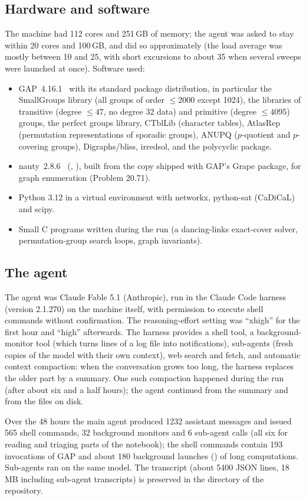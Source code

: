 \subsection{Hardware and software}
The machine had 112 cores and 251\,GB of memory; the agent was asked to stay within 20 cores and 100\,GB, and did
so approximately (the load average was mostly between 10 and 25, with short excursions to about 35 when several
sweeps were launched at once). Software used:
\begin{itemize}
\item GAP~4.16.1~\cite{GAP} with its standard package distribution, in particular the SmallGroups library (all groups of order
$\le 2000$ except 1024), the libraries of transitive (degree $\le 47$, no degree 32 data) and primitive (degree
$\le 4095$) groups, the perfect groups library, CTblLib (character tables), AtlasRep (permutation representations
of sporadic groups), ANUPQ ($p$-quotient and $p$-covering groups), Digraphs/bliss, irredsol, and the polycyclic
package.
\item nauty~2.8.6~\cite{nauty} (, ), built from the copy shipped with GAP's Grape package, for graph
enumeration (Problem 20.71).
\item Python 3.12 in a virtual environment with networkx, python-sat (CaDiCaL) and scipy.
\item Small C programs written during the run (a dancing-links exact-cover solver, permutation-group search
loops, graph invariants).
\end{itemize}

\subsection{The agent}
The agent was Claude Fable 5.1 (Anthropic), run in the Claude Code harness (version 2.1.270) on the machine
itself, with permission to execute shell commands without confirmation. The reasoning-effort setting was
``xhigh'' for the first hour and ``high'' afterwards. The harness provides a shell tool, a background-monitor tool
(which turns lines of a log file into notifications), sub-agents (fresh copies of the model with their own
context), web search and fetch, and automatic context compaction: when the conversation grows too long, the
harness replaces the older part by a summary. One such compaction happened during the run (after about six and a half hours); the agent continued from the summary and from the files on disk.

Over the 48 hours the main agent produced 1232 assistant messages and issued 565 shell commands, 32 background
monitors and 6 sub-agent calls (all six for reading and triaging parts of the notebook); the shell commands contain
193 invocations of GAP and about 180 background launches () of long computations. Sub-agents ran on the
same model. The transcript (about 5400 JSON lines, 18\,MB including sub-agent transcripts) is preserved in the
 directory of the repository.

